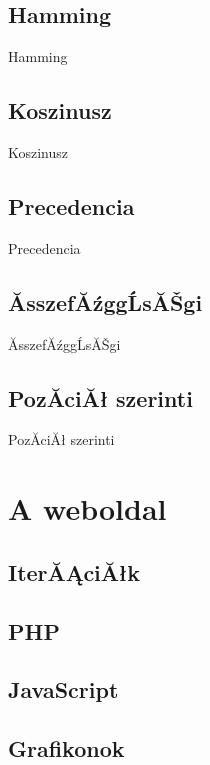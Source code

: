 \documentclass[12pt]{report}
\theoremstyle{definition}
\begin{document}


\section{Hamming}
Hamming

\section{Koszinusz}
Koszinusz

\section{Precedencia}
Precedencia

\section{ĂsszefĂźggĹsĂŠgi}
ĂsszefĂźggĹsĂŠgi

\section{PozĂ­ciĂł szerinti}
PozĂ­ciĂł szerinti

\chapter{A weboldal}

\section{IterĂĄciĂłk}

\section{PHP}

\section{JavaScript}

\section{Grafikonok}
\end{document}
